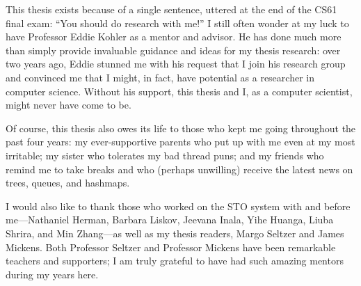     This thesis exists because of a single sentence, uttered at the end of the CS61 final exam: ``You should do research with me!'' I still often wonder at my luck to have Professor Eddie Kohler as a mentor and advisor. He has done much more than simply provide invaluable guidance and ideas for my thesis research: over two years ago, Eddie stunned me with his request that I join his research group and convinced me that I might, in fact, have potential as a researcher in computer science. Without his support, this thesis and I, as a computer scientist, might never have come to be.

    Of course, this thesis also owes its life to those who kept me going throughout the past four years: my ever-supportive parents who put up with me even at my most irritable; my sister who tolerates my bad thread puns; and my friends who remind me to take breaks and who (perhaps unwilling) receive the latest news on trees, queues, and hashmaps.

    I would also like to thank those who worked on the STO system with and before me---Nathaniel Herman, Barbara Liskov, Jeevana Inala, Yihe Huanga, Liuba Shrira, and Min Zhang---as well as my thesis readers, Margo Seltzer and James Mickens. Both Professor Seltzer and Professor Mickens have been remarkable teachers and supporters; I am truly grateful to have had such amazing mentors during my years here.
